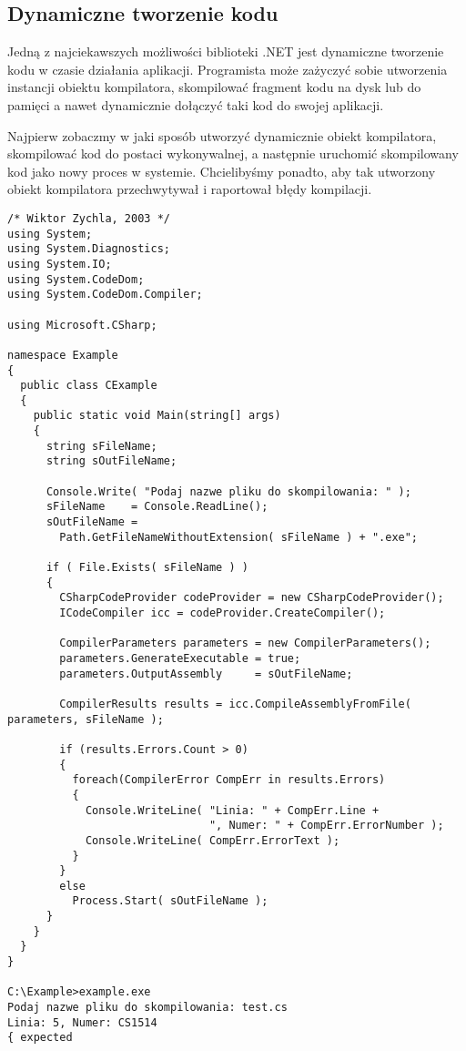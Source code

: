﻿\subsection{Dynamiczne tworzenie kodu}

Jedną z najciekawszych możliwości biblioteki .NET jest dynamiczne tworzenie kodu w czasie działania
aplikacji. Programista może zażyczyć sobie utworzenia instancji obiektu kompilatora, skompilować
fragment kodu na dysk lub do pamięci a nawet dynamicznie dołączyć taki kod do swojej aplikacji.

Najpierw zobaczmy w jaki sposób utworzyć dynamicznie obiekt kompilatora, skompilować kod
do postaci wykonywalnej, a następnie uruchomić skompilowany kod jako nowy proces w systemie.
Chcielibyśmy ponadto, aby tak utworzony obiekt kompilatora przechwytywał i raportował błędy kompilacji.

\begin{scriptsize}
\begin{verbatim}
/* Wiktor Zychla, 2003 */
using System;
using System.Diagnostics;
using System.IO;
using System.CodeDom;
using System.CodeDom.Compiler;

using Microsoft.CSharp;

namespace Example
{
  public class CExample 
  {
    public static void Main(string[] args)
    {
      string sFileName;
      string sOutFileName;

      Console.Write( "Podaj nazwe pliku do skompilowania: " );
      sFileName    = Console.ReadLine();
      sOutFileName = 
        Path.GetFileNameWithoutExtension( sFileName ) + ".exe";

      if ( File.Exists( sFileName ) )
      {
        CSharpCodeProvider codeProvider = new CSharpCodeProvider();
        ICodeCompiler icc = codeProvider.CreateCompiler();

        CompilerParameters parameters = new CompilerParameters();
        parameters.GenerateExecutable = true;
        parameters.OutputAssembly     = sOutFileName;
     
        CompilerResults results = icc.CompileAssemblyFromFile( parameters, sFileName );
      
        if (results.Errors.Count > 0)
        {
          foreach(CompilerError CompErr in results.Errors)
          {
            Console.WriteLine( "Linia: " + CompErr.Line + 
                               ", Numer: " + CompErr.ErrorNumber );
            Console.WriteLine( CompErr.ErrorText );
          }
        }
        else
          Process.Start( sOutFileName );            
      }
    }
  }
}

C:\Example>example.exe
Podaj nazwe pliku do skompilowania: test.cs
Linia: 5, Numer: CS1514
{ expected
\end{verbatim}
\end{scriptsize}

